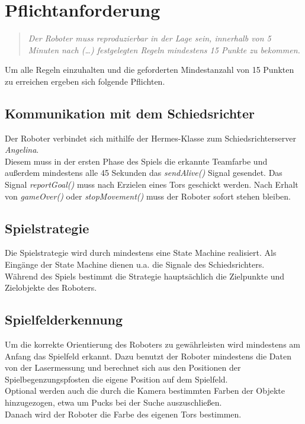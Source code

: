 \documentclass[12pt]{article}
\begin{document}
\section{Pflichtanforderung}
\begin{quote}
	\textit{Der Roboter muss reproduzierbar in der Lage sein, innerhalb von 5 Minuten nach (\ldots) festgelegten Regeln mindestens 15 Punkte zu bekommen.}
\end{quote}

Um alle Regeln einzuhalten und die geforderten Mindestanzahl von 15 Punkten zu erreichen ergeben sich folgende Pflichten.

\subsection{Kommunikation mit dem Schiedsrichter}
Der Roboter verbindet sich mithilfe der Hermes-Klasse zum Schiedsrichterserver \textit{Angelina}. \\
Diesem muss in der ersten Phase des Spiels die erkannte Teamfarbe und außerdem mindestens alle 45 Sekunden das \textit{sendAlive()} Signal gesendet. Das Signal \textit{reportGoal()} muss nach Erzielen eines Tors geschickt werden. Nach Erhalt von \textit{gameOver()} oder \textit{stopMovement()} muss der Roboter sofort stehen bleiben.

\subsection{Spielstrategie}
Die Spielstrategie wird durch mindestens eine State Machine realisiert. Als Eingänge der State Machine dienen u.a. die Signale des Schiedsrichters.\\
Während des Spiels bestimmt die Strategie hauptsächlich die Zielpunkte und Zielobjekte des Roboters.

\subsection{Spielfelderkennung}
Um die korrekte Orientierung des Roboters zu gewährleisten wird mindestens am Anfang das Spielfeld erkannt. Dazu benutzt der Roboter mindestens die Daten von der Lasermessung und berechnet sich aus den Positionen der Spielbegenzungspfosten die eigene Position auf dem Spielfeld.\\
Optional werden auch die durch die Kamera bestimmten Farben der Objekte hinzugezogen, etwa um Pucks bei der Suche auszuschließen.\\
Danach wird der Roboter die Farbe des eigenen Tors bestimmen.
\end{document}
